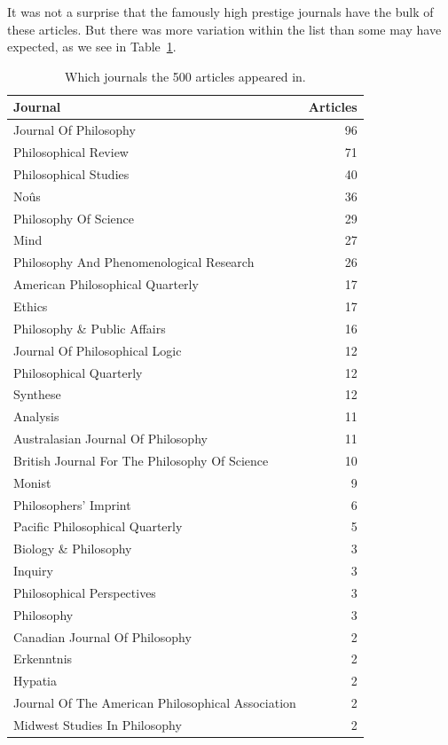 \documentclass[
  10pt,
  letterpaper,
  DIV=11,
  numbers=noendperiod,
  twoside]{scrartcl}
\begin{document}
It was not a surprise that the famously high prestige journals have the
bulk of these articles. But there was more variation within the list
than some may have expected, as we see in
Table~\ref{tbl-journals-in-main-bib}.

\begin{longtable}[]{@{}lr@{}}

\caption{\label{tbl-journals-in-main-bib}Which journals the 500 articles
appeared in.}

\tabularnewline

\toprule\noalign{}
Journal & Articles \\
\midrule\noalign{}
\endhead
\bottomrule\noalign{}
\endlastfoot
Journal Of Philosophy & 96 \\
Philosophical Review & 71 \\
Philosophical Studies & 40 \\
Noûs & 36 \\
Philosophy Of Science & 29 \\
Mind & 27 \\
Philosophy And Phenomenological Research & 26 \\
American Philosophical Quarterly & 17 \\
Ethics & 17 \\
Philosophy \& Public Affairs & 16 \\
Journal Of Philosophical Logic & 12 \\
Philosophical Quarterly & 12 \\
Synthese & 12 \\
Analysis & 11 \\
Australasian Journal Of Philosophy & 11 \\
British Journal For The Philosophy Of Science & 10 \\
Monist & 9 \\
Philosophers' Imprint & 6 \\
Pacific Philosophical Quarterly & 5 \\
Biology \& Philosophy & 3 \\
Inquiry & 3 \\
Philosophical Perspectives & 3 \\
Philosophy & 3 \\
Canadian Journal Of Philosophy & 2 \\
Erkenntnis & 2 \\
Hypatia & 2 \\
Journal Of The American Philosophical Association & 2 \\
Midwest Studies In Philosophy & 2 \\

\end{longtable}
\end{document}
